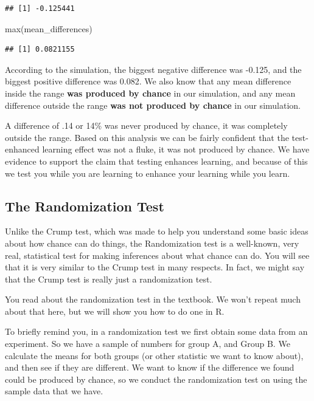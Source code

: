 \documentclass[
]{book}
\newenvironment{Shaded}{\begin{snugshade}}{\end{snugshade}}
\newcommand{\FunctionTok}[1]{\textcolor[rgb]{0.00,0.00,0.00}{#1}}
\newcommand{\NormalTok}[1]{#1}
\begin{document}
\begin{verbatim}
## [1] -0.125441
\end{verbatim}

\begin{Shaded}
\begin{Highlighting}[]
\FunctionTok{max}\NormalTok{(mean\_differences)}
\end{Highlighting}
\end{Shaded}

\begin{verbatim}
## [1] 0.0821155
\end{verbatim}

According to the simulation, the biggest negative difference was -0.125, and the biggest positive difference was 0.082. We also know that any mean difference inside the range \textbf{was produced by chance} in our simulation, and any mean difference outside the range \textbf{was not produced by chance} in our simulation.

A difference of .14 or 14\% was never produced by chance, it was completely outside the range. Based on this analysis we can be fairly confident that the test-enhanced learning effect was not a fluke, it was not produced by chance. We have evidence to support the claim that testing enhances learning, and because of this we test you while you are learning to enhance your learning while you learn.

\hypertarget{the-randomization-test}{%
\subsection{The Randomization Test}\label{the-randomization-test}}

Unlike the Crump test, which was made to help you understand some basic ideas about how chance can do things, the Randomization test is a well-known, very real, statistical test for making inferences about what chance can do. You will see that it is very similar to the Crump test in many respects. In fact, we might say that the Crump test is really just a randomization test.

You read about the randomization test in the textbook. We won't repeat much about that here, but we will show you how to do one in R.

To briefly remind you, in a randomization test we first obtain some data from an experiment. So we have a sample of numbers for group A, and Group B. We calculate the means for both groups (or other statistic we want to know about), and then see if they are different. We want to know if the difference we found could be produced by chance, so we conduct the randomization test on using the sample data that we have.
\end{document}
